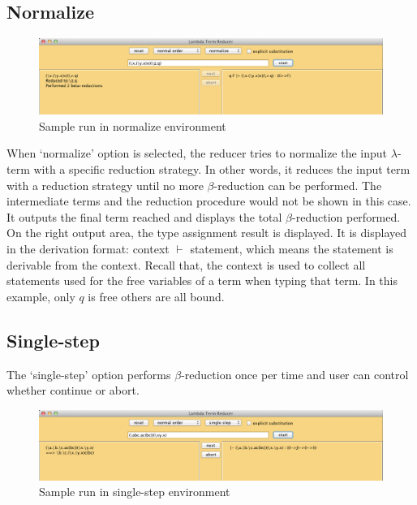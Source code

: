 \subsection{Normalize}

\begin{figure}[ht]
\centering
\includegraphics[width=\textwidth]{pics/normalize}
\caption{Sample run in normalize environment}
\label{fig:normalize}
\end{figure}

When `normalize' option is selected, the reducer tries to normalize the input $\lambda$-term with a specific reduction strategy. In other words, it reduces the input term with a reduction strategy until no more $\beta$-reduction can be performed. The intermediate terms and the reduction procedure would not be shown in this case. It outputs the final term reached and displays the total $\beta$-reduction performed. On the right output area, the type assignment result is displayed. It is displayed in the derivation format: context $\vdash$ statement, which means the statement is derivable from the context. Recall that, the context is used to collect all statements used for the free variables of a term when typing that term. In this example, only $q$ is free others are all bound. 

\subsection{Single-step}

The `single-step' option performs $\beta$-reduction once per time and user can control whether continue or abort. 

\begin{figure}[ht]
\centering
\includegraphics[width=\textwidth]{pics/single1}
\caption{Sample run in single-step environment}
\label{fig:s1}
\end{figure}

